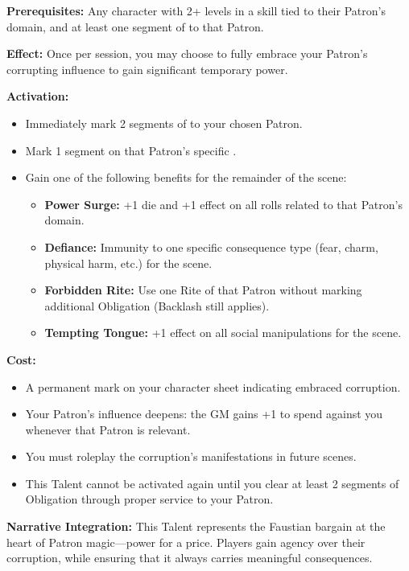 \textbf{Prerequisites:} Any character with 2+ levels in a skill tied to their Patron's domain, and at least one segment of  to that Patron.

\textbf{Effect:} Once per session, you may choose to fully embrace your Patron’s corrupting influence to gain significant temporary power.

\textbf{Activation:}
\begin{itemize}
    \item Immediately mark 2 segments of  to your chosen Patron.
    \item Mark 1 segment on that Patron’s specific .
    \item Gain one of the following benefits for the remainder of the scene:
    \begin{itemize}
        \item \textbf{Power Surge:} +1 die and +1 effect on all rolls related to that Patron’s domain.
        \item \textbf{Defiance:} Immunity to one specific consequence type (fear, charm, physical harm, etc.) for the scene.
        \item \textbf{Forbidden Rite:} Use one Rite of that Patron without marking additional Obligation (Backlash still applies).
        \item \textbf{Tempting Tongue:} +1 effect on all social manipulations for the scene.
    \end{itemize}
\end{itemize}

\textbf{Cost:}
\begin{itemize}
    \item A permanent mark on your character sheet indicating embraced corruption.
    \item Your Patron’s influence deepens: the GM gains +1  to spend against you whenever that Patron is relevant.
    \item You must roleplay the corruption’s manifestations in future scenes.
    \item This Talent cannot be activated again until you clear at least 2 segments of Obligation through proper service to your Patron.
\end{itemize}

\textbf{Narrative Integration:} This Talent represents the Faustian bargain at the heart of Patron magic—power for a price. Players gain agency over their corruption, while ensuring that it always carries meaningful consequences.

